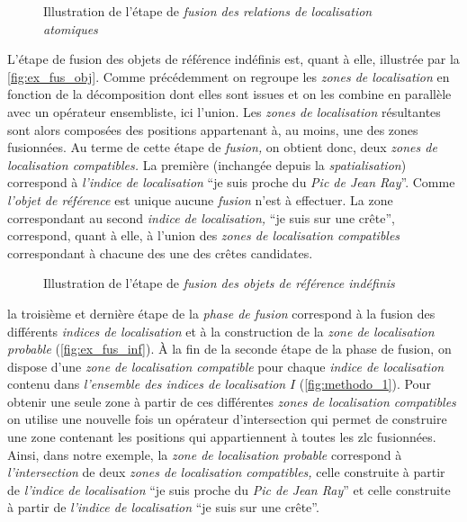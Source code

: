 \begin{figure}
  \centering
  
  \caption{Illustration de l'étape de \emph{fusion des relations de
      localisation atomiques}}
  \label{fig:ex_fus_rsa}
\end{figure}

L'étape de fusion des objets de référence indéfinis est, quant à elle,
illustrée par la \autoref{fig:ex_fus_obj}. Comme précédemment on
regroupe les \emph{zones de localisation} en fonction de la
décomposition dont elles sont issues et on les combine en parallèle
avec un opérateur ensembliste, ici l'union. Les \emph{zones de
  localisation} résultantes sont alors composées des positions
appartenant à, au moins, une des zones fusionnées. Au terme de cette
étape de \emph{fusion,} on obtient donc, deux \emph{zones de
  localisation compatibles.} La première (inchangée depuis la
\emph{spatialisation}) correspond à \emph{l'indice de localisation}
\enquote{je suis proche du \emph{Pic de Jean Ray}}. Comme
\emph{l'objet de référence} est unique aucune \emph{fusion} n'est à
effectuer. La zone correspondant au second \emph{indice de
  localisation,} \enquote{je suis sur une crête}, correspond, quant à
elle, à l'union des \emph{zones de localisation compatibles}
correspondant à chacune des une des crêtes candidates.

\begin{figure}
  \centering
  
  \caption{Illustration de l'étape de \emph{fusion des objets de
      référence indéfinis}}
  \label{fig:ex_fus_obj}
\end{figure}

la troisième et dernière étape de la \emph{phase de fusion} correspond
à la fusion des différents \emph{indices de localisation} et à la
construction de la \emph{zone de localisation probable}
(\autoref{fig:ex_fus_inf}). À la fin de la seconde étape de la phase
de fusion, on dispose d'une \emph{zone de localisation compatible}
pour chaque \emph{indice de localisation} contenu dans
\emph{l'ensemble des indices de localisation} \(I\)
(\autoref{fig:methodo_1}). Pour obtenir une seule zone à partir de ces
différentes \emph{zones de localisation compatibles} on utilise une
nouvelle fois un opérateur d'intersection qui permet de construire une
zone contenant les positions qui appartiennent à toutes les \ac{zlc}
fusionnées. Ainsi, dans notre exemple, la \emph{zone de localisation
  probable} correspond à \emph{l'intersection} de deux \emph{zones de
  localisation compatibles,} celle construite à partir de
\emph{l'indice de localisation} \enquote{je suis proche du \emph{Pic
    de Jean Ray}} et celle construite à partir de \emph{l'indice de
  localisation} \enquote{je suis sur une crête}.

